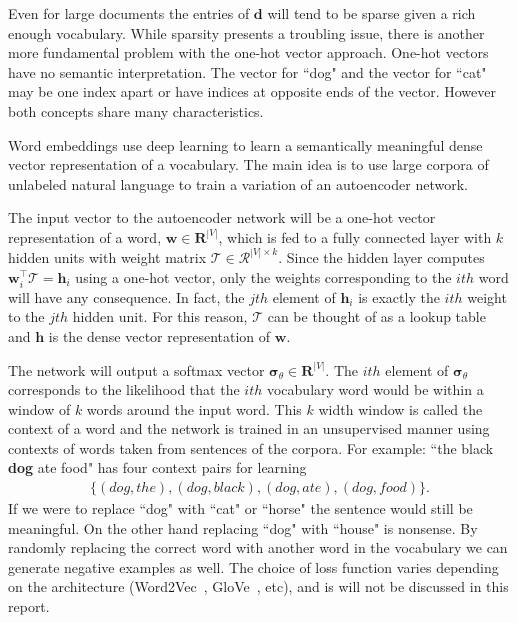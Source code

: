 \documentclass[11pt]{article}
\begin{document}
Even for large documents the entries of $\textbf{d}$ will tend to be sparse given a rich enough vocabulary.  While sparsity presents a troubling issue, there is another more fundamental problem with the one-hot vector approach.  One-hot vectors have no semantic interpretation.  The vector for ``dog" and the vector for ``cat" may be one index apart or have indices at opposite ends of the vector.  However both concepts share many characteristics.

Word embeddings use deep learning to learn a semantically meaningful dense vector representation of a vocabulary.  The main idea is to use large corpora of unlabeled natural language to train a variation of an autoencoder network.

The input vector to the autoencoder network will be a one-hot vector representation of a word, $\textbf{w} \in \mathbf{R}^{|V|}$, which is fed to a fully connected layer with $k$ hidden units with weight matrix $\mathcal{T} \in \mathcal{R}^{|V| \times k}$.  Since the hidden layer computes $\textbf{w}_i^{\top} \mathcal{T} = \textbf{h}_i$ using a one-hot vector, only the weights corresponding to the $ith$ word will have any consequence.  In fact, the $jth$ element of $\textbf{h}_i$ is exactly the $ith$ weight to the $jth$ hidden unit.  For this reason, $\mathcal{T}$ can be thought of as a lookup table and $\textbf{h}$ is the dense vector representation of $\textbf{w}$.

The network will  output a softmax vector $\boldsymbol{\sigma}_\theta \in \mathbf{R}^{|V|}$.  The $ith$ element of $\boldsymbol{\sigma}_\theta$ corresponds to the likelihood that the $ith$ vocabulary word would be within a window of $k$ words around the input word.  This $k$ width window is called the context of a word and the network is trained in an unsupervised manner using contexts of words taken from sentences of the corpora.  For example: ``the black \textbf{dog} ate food" has four context pairs for learning 
\begin{gather*}
\{ (dog, the), (dog, black), (dog, ate), (dog, food) \}.
\end{gather*}
If we were to replace ``dog" with ``cat" or ``horse" the sentence would still be meaningful.  On the other hand replacing ``dog" with ``house" is nonsense.  By randomly replacing the correct word with another word in the vocabulary we can generate negative examples as well.  The choice of loss function varies depending on the architecture (Word2Vec~\cite{Mikolov:2013:DRW:2999792.2999959}, GloVe~\cite{Pennington14glove:global}, etc), and is will not be discussed in this report.  
\end{document}
